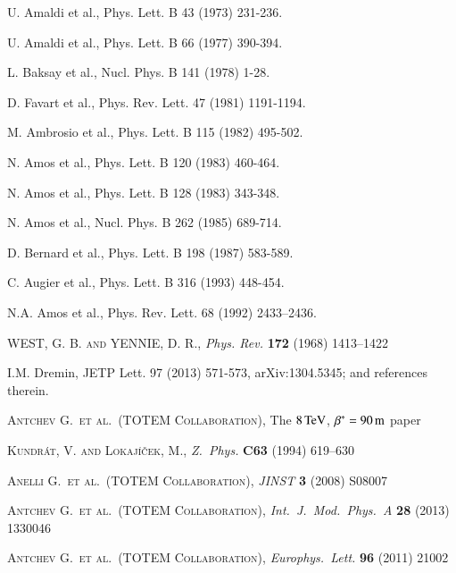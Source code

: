 \documentclass[3p,twocolumn,a4paper]{elsarticle}
\def\un#1{\,{\rm #1}}
\def\etal{et al.}
\def\Name#1{\textsc{#1}, }
\def\REVIEW#1#2#3#4{{\it #1} {\bf #2} (#3) #4}
\begin{document}
\begin{thebibliography}{99}


 U. Amaldi et al., Phys. Lett. B 43 (1973) 231-236.

 U. Amaldi et al., Phys. Lett. B 66 (1977) 390-394.

 L. Baksay et al., Nucl. Phys. B 141 (1978) 1-28.

 D. Favart et al., Phys. Rev. Lett. 47 (1981) 1191-1194.

 M. Ambrosio et al., Phys. Lett. B 115 (1982) 495-502.

 N. Amos et al., Phys. Lett. B 120 (1983) 460-464.

 N. Amos et al., Phys. Lett. B 128 (1983) 343-348.

 N. Amos et al., Nucl. Phys. B 262 (1985) 689-714.

 D. Bernard et al., Phys. Lett. B 198 (1987) 583-589.

 C. Augier et al., Phys. Lett. B 316 (1993) 448-454.

 N.A. Amos et al., Phys. Rev. Lett. 68 (1992) 2433–2436.


	\Name{WEST, G. B. and YENNIE, D. R.}
	\REVIEW{Phys. Rev.}{172}{1968}{1413--1422}

 I.M. Dremin, JETP Lett. 97 (2013) 571-573, arXiv:1304.5345; and references therein.

	\Name{Antchev G.~\etal{}~(TOTEM Collaboration)}
	The $8\un{TeV}$, $\beta^* = 90\un{m}$ paper

	\Name{Kundr\' at, V. and Lokaj\' i\v cek, M.}
	\REVIEW{Z.~Phys.}{C63}{1994}{619--630}


	\Name{Anelli G.~\etal{}~(TOTEM Collaboration)}
	\REVIEW{JINST}{3}{2008}{S08007}

	\Name{Antchev G.~\etal{}~(TOTEM Collaboration)}
	\REVIEW{Int.~J.~Mod.~Phys.~A}{28}{2013}{1330046}


	\Name{Antchev G.~\etal{}~(TOTEM Collaboration)}
	\REVIEW{Europhys.~Lett.}{96}{2011}{21002}


\end{thebibliography}
\end{document}

